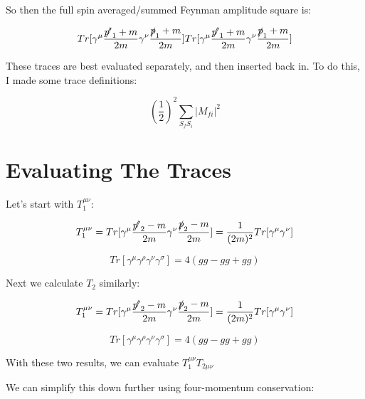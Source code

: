 \documentclass[a4]{article}
\begin{document}
    So then the full spin averaged/summed Feynman amplitude square is:

    \begin{framed}
        \begin{equation}
            Tr [\gamma^\mu \frac{\slashed{p'}_1 + m}{2m} \gamma^\nu \frac{\slashed{p}_1 + m}{2 m}] Tr [\gamma^\mu \frac{\slashed{p'}_1 + m}{2m} \gamma^\nu \frac{\slashed{p}_1 + m}{2 m}]
        \end{equation}
    \end{framed}

    These traces are best evaluated separately, and then inserted back in. To do this, I made some trace definitions:

    \begin{equation}
        (\frac{1}{2})^2 \sum_{S_f S_i} |M_{f i}|^2
    \end{equation}

    \section*{Evaluating The Traces}

    Let's start with $T_1^{\mu \nu}$:

    \begin{equation}
        T_1^{\mu \nu} = Tr [\gamma^\mu \frac{\slashed{p'}_2 - m}{2m} \gamma^\nu \frac{\slashed{p}_2 - m}{2 m}] = \frac{1}{(2m)^2} Tr[\gamma^\mu \gamma^\nu]
    \end{equation}

    \begin{equation}
        Tr [\gamma^\mu \gamma^\rho \gamma^\nu \gamma^\sigma] = 4(g g - g g + g g)
    \end{equation}

    Next we calculate $T_2$ similarly:

    \begin{equation}
        T_1^{\mu \nu} = Tr [\gamma^\mu \frac{\slashed{p'}_2 - m}{2m} \gamma^\nu \frac{\slashed{p}_2 - m}{2 m}] = \frac{1}{(2m)^2} Tr[\gamma^\mu \gamma^\nu]
    \end{equation}

    \begin{equation}
        Tr [\gamma^\mu \gamma^\rho \gamma^\nu \gamma^\sigma] = 4(g g - g g + g g)
    \end{equation}

    With these two results, we can evaluate $T_1^{\mu \nu} T_{2 \mu \nu}$

    We can simplify this down further using four-momentum conservation:
\end{document}
